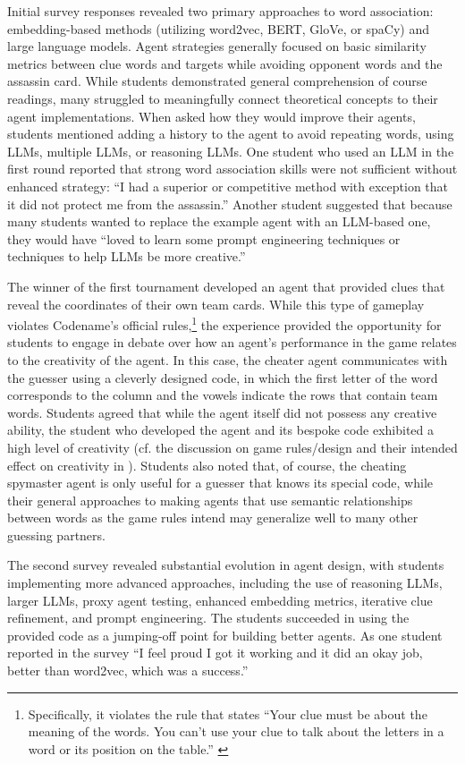 \documentclass[phd,electronic,oneside,twosidetoc,letterpaper,chaptercenter,parttop,lof]{byumsphd}
\begin{document}
Initial survey responses revealed two primary approaches to word association: embedding-based methods (utilizing word2vec, BERT, GloVe, or spaCy) and large language models. Agent strategies generally focused on basic similarity metrics between clue words and targets while avoiding opponent words and the assassin card. While students demonstrated general comprehension of course readings, many struggled to meaningfully connect theoretical concepts to their agent implementations. When asked how they would improve their agents, students mentioned adding a history to the agent to avoid repeating words, using LLMs, multiple LLMs, or reasoning LLMs. One student who used an LLM in the first round reported that strong word association skills were not sufficient without enhanced strategy: ``I had a superior or competitive method with exception that it did not protect me from the assassin.'' Another student suggested that because many students wanted to replace the example agent with an LLM-based one, they would have ``loved to learn some prompt engineering techniques or techniques to help LLMs be more creative.''

The winner of the first tournament developed an agent that provided clues that reveal the coordinates of their own team cards. While this type of gameplay violates Codename’s official rules,\footnote{Specifically, it violates the rule that states “Your clue must be about the meaning of the words. You can’t use your clue to talk about the letters in a word or its position on the table.” \cite{codenames2015rules}} the experience provided the opportunity for students to engage in debate over how an agent’s performance in the game relates to the creativity of the agent. In this case, the cheater agent communicates with the guesser using a cleverly designed  code, in which the first letter of the word corresponds to the column and the vowels indicate the rows that contain team words. Students agreed that while the agent itself did not possess any creative ability, the student who developed the agent and its bespoke code exhibited a high level of creativity (cf. the discussion on game rules/design and their intended effect on creativity in \cite{spendlove2023}).  Students also noted that, of course, the cheating spymaster agent is only useful for a guesser that knows its special code, while their general approaches to making agents that use semantic relationships between words as the game rules intend may generalize well to many other guessing partners.

The second survey revealed substantial evolution in agent design, with students implementing more advanced approaches, including the use of reasoning LLMs, larger LLMs, proxy agent testing, enhanced embedding metrics, iterative clue refinement, and prompt engineering. The students succeeded in using the provided code as a jumping-off point for building better agents. As one student reported in the survey ``I feel proud I got it working and it did an okay job, better than word2vec, which was a success.''
\end{document}
